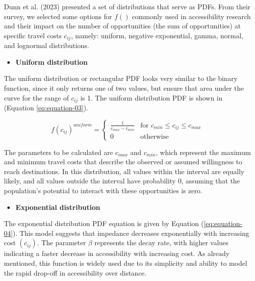 \documentclass[preprint, 3p,
authoryear]{elsarticle} %
\providecommand{\tightlist}{%
  \setlength{\itemsep}{0pt}\setlength{\parskip}{0pt}}
\begin{document}
Dunn et al. (2023) presented a set of distributions that serve as PDFs.
From their survey, we selected some options for \(f()\) commonly used in
accessibility research and their impact on the number of opportunities
(the sum of opportunities) at specific travel costs \(c_{ij}\), namely:
uniform, negative exponential, gamma, normal, and lognormal
distributions.

\begin{itemize}
\tightlist
\item
  \textbf{Uniform distribution}
\end{itemize}

The uniform distribution or rectangular PDF looks very similar to the
binary function, since it only returns one of two values, but ensure
that area under the curve for the range of \(c_{ij}\) is 1. The uniform
distribution PDF is shown in (Equation \ref{eq:equation-03}).

\begin{equation}
f(c_{ij})^{uniform} =
\begin{cases}
  \frac{1}{c_{max} - c_{min}} & \text{for } c_{min} \le c_{ij} \le c_{max} \\
  0 & \text{otherwise}
\end{cases}
\label{eq:equation-03}
\end{equation}

The parameters to be calculated are \(c_{max}\) and \(c_{min}\), which
represent the maximum and minimum travel costs that describe the
observed or assumed willingness to reach destinations. In this
distribution, all values within the interval are equally likely, and all
values outside the interval have probability 0, assuming that the
population's potential to interact with these opportunities is zero.

\begin{itemize}
\tightlist
\item
  \textbf{Exponential distribution}
\end{itemize}

The exponential distribution PDF equation is given by Equation
(\ref{eq:equation-04}). This model suggests that impedance decreases
exponentially with increasing cost \((c_{ij})\). The parameter \(\beta\)
represents the decay rate, with higher values indicating a faster
decrease in accessibility with increasing cost. As already mentioned,
this function is widely used due to its simplicity and ability to model
the rapid drop-off in accessibility over distance.
\end{document}
